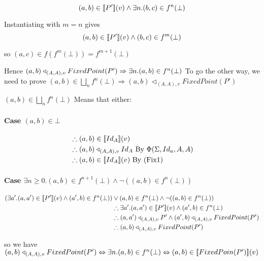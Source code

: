 \documentclass[12pt,a4paper,twoside,openright]{report}
\newcommand{\db}[1]{{\bf [\![}#1{\bf ]\!]}}
\newcommand{\deno}[1]{\db{#1}(v)}
\newcommand{\denoRule}[2]{#1 \in \deno{#2}}
\newcommand{\opRule}[3]{#1 \triangleleft_{#2, v} #3}
\newcommand{\phiRule}[3]{\Phi(\Sigma, #1, #2, #3)}
\begin{document}
{{$$\denoRule{(a, b)}{P'} \wedge \exists n. (b, c) \in f^n(\bot)$$

Instantiating with $m = n$ gives
$$\denoRule{(a, b)}{P'} \wedge (b, c) \in f^m(\bot)$$

so $(a,c) \in f(f^m(\bot)) = f^{m+1}(\bot)$

Hence $\opRule{(a, b)}{(A, A)}{FixedPoint(P')} \Rightarrow \exists n. (a, b) \in f^n(\bot)\\\\ $
To go the other way, we need to prove $(a, b) \in \bigsqcup_nf^n(\bot) \Rightarrow \opRule{(a, b)}{(A, A)}{FixedPoint(P')}$

$(a, b) \in \bigsqcup_n f^n(\bot)$ Means that either:

\paragraph{Case $(a, b) \in \bot$}
\begin{equation}
\label{Case Bottom}
\begin{split}
& \therefore \denoRule{(a,b)}{Id_A}\\
& \therefore \opRule{(a,b)}{(A, A)}{Id_A} \mbox{ By $\phiRule{Id_a}{A}{A}$}\\
& \therefore \denoRule{(a,b)}{Id_A} \mbox{ By (Fix1)}
\end{split}
\end{equation}

\paragraph{Case $\exists n \geq 0. (a, b) \in f^{n+1}(\bot) \wedge \neg ((a, b) \in f^n(\bot))$}
\begin{equation}
\label{Case n+1}
\begin{split}
(\exists a'. \denoRule{(a, a')}{P'} \wedge (a', b) \in f^{n}(\bot)) & \vee (a, b) \in f^{n}(\bot) \wedge \neg ((a, b) \in f^n(\bot))\\
&\therefore \exists a'. \denoRule{(a, a')}{P'} \wedge (a', b) \in f^{n}(\bot)\\
&\therefore \opRule{(a, a')}{(A, A)}{P'} \wedge \opRule{(a', b)}{(A, A)}{FixedPoint(P')}\\
&\therefore \opRule{(a,b)}{(A,A)}{FixedPoint(P')}
\end{split}
\end{equation}

so we have $\opRule{(a, b)}{(A, A)}{FixedPoint(P')} \Leftrightarrow \exists n. (a, b) \in f^n(\bot) \Leftrightarrow \denoRule{(a, b)}{FixedPoin(P')}$

}}
\end{document}
